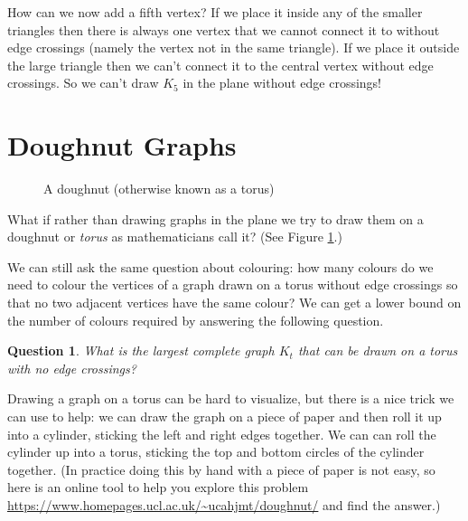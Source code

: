 \documentclass[12pt]{article}
\newtheorem{question}{Question}
\begin{document}
How can we now add a fifth vertex? If we place it inside any of the smaller triangles then there is always one vertex that we cannot connect it to without edge crossings (namely the vertex not in the same triangle). If we place it outside the large triangle then we can't connect it to the central vertex without edge crossings. So we can't draw $K_5$ in the plane without edge crossings!


\fi

\section*{Doughnut Graphs}
\begin{figure}[!h]
\begin{center}
\end{center}\caption{A doughnut (otherwise known as a torus)}\label{torus}
\end{figure}



What if rather than drawing graphs in the plane we try to draw them on a doughnut or \emph{torus} as mathematicians call it? (See Figure \ref{torus}.) 

We can still ask the same question about colouring: how many colours do we need to colour the vertices of a graph drawn on a torus without edge crossings so that no two adjacent vertices have the same colour? We can get a lower bound on the number of colours required by answering the following question.
\begin{question}
What is the largest complete graph $K_t$ that can be drawn on a torus with no edge crossings?
\end{question}
Drawing a graph on a torus can be hard to visualize, but there is a nice trick we can use to help: we can draw the graph on a piece of paper and then roll it up into a cylinder, sticking the left and right edges together. We can can roll the cylinder up into a torus, sticking the top and bottom circles of the cylinder together. (In practice doing this by hand with a piece of paper is not easy, so here is an online tool to help you explore this problem \url{https://www.homepages.ucl.ac.uk/~ucahjmt/doughnut/} and find the answer.)
\end{document}
